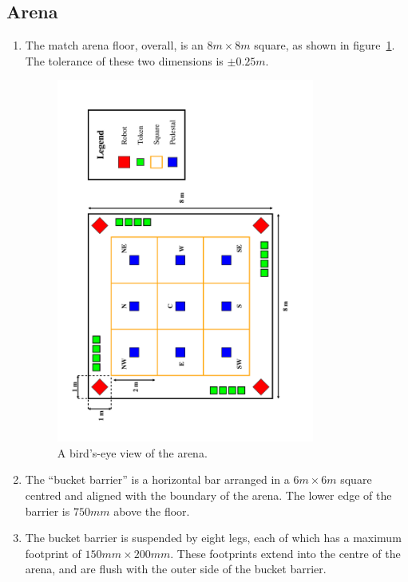 \subsection{Arena}
\label{sub:arena}
\begin{enumerate}
\item The match arena floor, overall, is an $8m \times 8m$ square, as shown in figure~\ref{fig:arena-dim}.  The tolerance of these two dimensions is $\pm0.25m$.

\begin{figure}
  \centering
  \includegraphics[width=0.8\textwidth]{./images/arena.pdf}
  \caption{\label{fig:arena-dim}A bird's-eye view of the arena.}
\end{figure}

\item The ``bucket barrier'' is a horizontal bar arranged in a $6m \times 6m$ square centred and aligned with the boundary of the arena.  The lower edge of the barrier is $750mm$ above the floor.

\item The bucket barrier is suspended by eight legs, each of which has a maximum footprint of $150mm \times 200mm$.  These footprints extend into the centre of the arena, and are flush with the outer side of the bucket barrier.


\end{enumerate}
